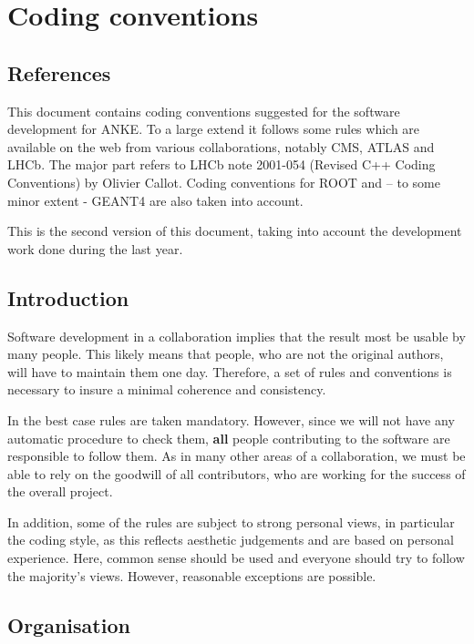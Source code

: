 \chapter{Coding conventions} 
\label{app:coding}

\section{References}

This document contains coding conventions suggested for the
software development for ANKE. To a large extend it follows some rules 
which are available on the web from various collaborations, 
notably CMS, ATLAS and LHCb. The major part refers to 
LHCb note 2001-054 (Revised C++ Coding Conventions) by Olivier Callot.
Coding conventions for ROOT and -- to some minor extent - GEANT4 are
also taken into account.

This is the second version of this document, taking into account the
development work done during the last year.

\section{Introduction}

Software development in a collaboration implies that the result most be
usable by many people. This likely means that people, who are not the original 
authors, will have to maintain them one day. Therefore, a set of rules and
conventions is necessary to insure a minimal coherence and consistency.

In the best case rules are taken mandatory. However, since we will
not have any automatic procedure to check them, {\bf all} people
contributing to the software are responsible to follow them. 
As in many other areas of a collaboration, we must be able to rely on 
the goodwill of all contributors, who are working for the success of 
the overall project.

In addition, some of the rules are subject to strong personal views, 
in particular the coding style, as this reflects aesthetic judgements 
and are based on personal experience. Here, common sense should be used and 
everyone should try to follow the majority's views. However, reasonable 
exceptions are possible. 

\section{Organisation}

